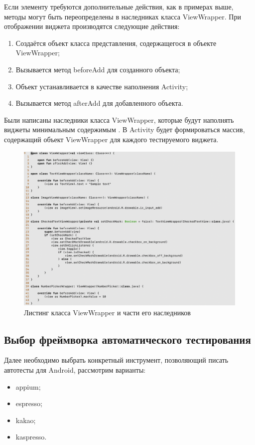 \documentclass[a4paper,14pt]{extarticle} %
\begin{document}
	Если элементу требуются дополнительные действия, как в примерах выше, методы могут быть переопределены в наследниках класса ViewWrapper. При отображении виджета производятся следующие действия:
	\begin{enumerate}
		\item Создаётся объект класса представления, содержащегося в объекте ViewWrapper;
		\item Вызывается метод beforeAdd для созданного объекта;
		\item Объект устанавливается в качестве наполнения Activity;
		\item Вызывается метод afterAdd для добавленного объекта.
	\end{enumerate}

	Были написаны наследники класса ViewWrapper, которые будут наполнять виджеты минимальным содержимым \ris{\ref{fig:wrapper}}. В Activity будет формироваться массив, содержащий объект ViewWrapper для каждого тестируемого виджета.
	
	\begin{figure}[tbh]
		\includegraphics[width=\textwidth]{wrapper}
		\caption{Листинг класса ViewWrapper и части его наследников}
		\label{fig:wrapper}
	\end{figure}
	
	\subsection{Выбор фреймворка автоматического тестирования}
	
	Далее необходимо выбрать конкретный инструмент, позволяющий писать автотесты для Android, рассмотрим варианты:
	\begin{itemize}
		\item appium;
		\item espresso;
		\item kakao;
		\item kaspresso.
	\end{itemize}
	
\end{document}
